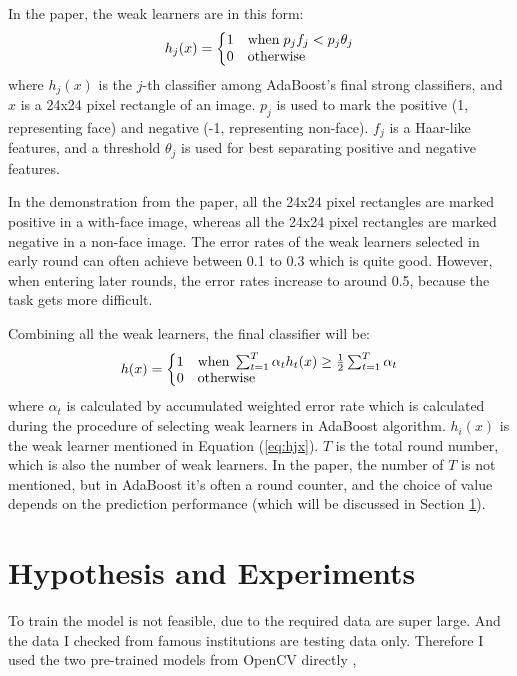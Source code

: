 \documentclass[10pt,twocolumn,letterpaper]{article}
\begin{document}
In the paper, the weak learners are in this form:
\begin{equation}
\label{eq:hjx}
h_{j}(x)=\left\{\begin{matrix*}[l]
1 & \textup{when} \; p_{j}f_{j} < p_{j}\theta _{j}\\
0 & \textup{otherwise}
\end{matrix*}\right.
\end{equation}
where $h_{j}(x)$ is the $j$-th classifier among AdaBoost's final strong classifiers, and $x$ is a 24x24 pixel rectangle of an image.
$p_{j}$ is used to mark the positive (1, representing face) and negative (-1, representing non-face).
$f_{j}$ is a Haar-like features, and a threshold $\theta _{j}$ is used for best separating positive and negative features.

In the demonstration from the paper, all the 24x24 pixel rectangles are marked positive in a with-face image,
whereas all the 24x24 pixel rectangles are marked negative in a non-face image.
The error rates of the weak learners selected in early round can often achieve between 0.1 to 0.3 which is quite good.
However, when entering later rounds, the error rates increase to around 0.5, because the task gets more difficult.

Combining all the weak learners, the final classifier will be:
$$h(x)=\left\{\begin{matrix*}[l]
1 & \textup{when} \; \sum_{t=1}^{T} \alpha _{t} h_{t}(x) \geq \frac{1}{2} \sum_{t=1}^{T} \alpha _{t}\\
0 & \textup{otherwise}
\end{matrix*}\right.$$
where $\alpha _{t}$ is calculated by accumulated weighted error rate which is calculated during the procedure of selecting weak learners in AdaBoost algorithm.
$h_{i}(x)$ is the weak learner mentioned in Equation (\ref{eq:hjx}). $T$ is the total round number, which is also the number of weak learners.
In the paper, the number of $T$ is not mentioned, but in AdaBoost it's often a round counter,
and the choice of value depends on the prediction performance (which will be discussed in Section \ref{sec:hypo}).

\section{Hypothesis and Experiments} \label{sec:hypo}
To train the model is not feasible, due to the required data are super large. And the data I checked from famous institutions are testing data only.
Therefore I used the two pre-trained models from OpenCV directly \cite{opencvmodels},
\end{document}
